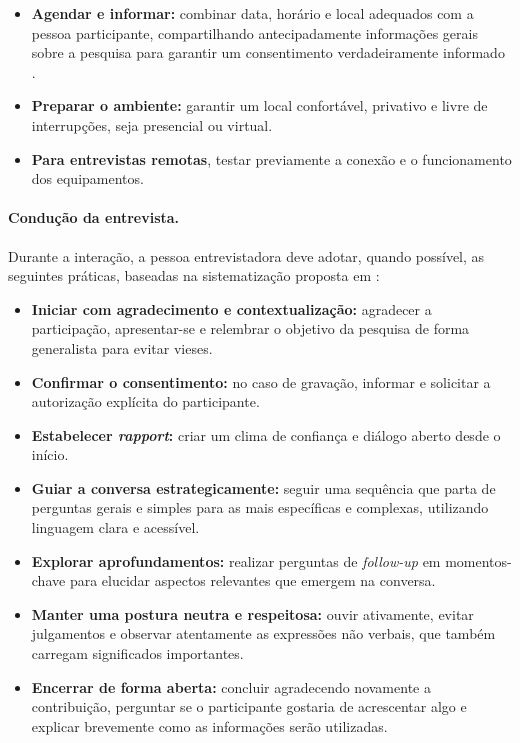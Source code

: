 \documentclass[12pt, a4paper, openany]{book}
\begin{document}
\begin{itemize}
\item \textbf{Agendar e informar:} combinar data, hor\'ario e local adequados com a pessoa participante, compartilhando antecipadamente informa\c{c}\~oes gerais sobre a pesquisa para garantir um consentimento verdadeiramente informado \citep{guazi2021diretrizes}.
\item \textbf{Preparar o ambiente:} garantir um local confort\'avel, privativo e livre de interrup\c{c}\~oes, seja presencial ou virtual.
\item \textbf{Para entrevistas remotas}, testar previamente a conex\~ao e o funcionamento dos equipamentos.
\end{itemize}

\paragraph{Condu\c{c}\~ao da entrevista.} Durante a intera\c{c}\~ao, a pessoa entrevistadora deve adotar, quando poss\'ivel, as seguintes pr\'aticas, baseadas na sistematiza\c{c}\~ao proposta em \citet{rocha2020teoria}:

\begin{itemize}
\item \textbf{Iniciar com agradecimento e contextualiza\c{c}\~ao:} agradecer a participa\c{c}\~ao, apresentar-se e relembrar o objetivo da pesquisa de forma generalista para evitar vieses.
\item \textbf{Confirmar o consentimento:} no caso de grava\c{c}\~ao, informar e solicitar a autoriza\c{c}\~ao expl\'icita do participante.
\item \textbf{Estabelecer \textit{rapport}:} criar um clima de confian\c{c}a e di\'alogo aberto desde o in\'icio.
\item \textbf{Guiar a conversa estrategicamente:} seguir uma sequ\^encia que parta de perguntas gerais e simples para as mais espec\'ificas e complexas, utilizando linguagem clara e acess\'ivel.
\item \textbf{Explorar aprofundamentos:} realizar perguntas de \textit{follow-up} em momentos-chave para elucidar aspectos relevantes que emergem na conversa.
\item \textbf{Manter uma postura neutra e respeitosa:} ouvir ativamente, evitar julgamentos e observar atentamente as express\~oes n\~ao verbais, que tamb\'em carregam significados importantes.
\item \textbf{Encerrar de forma aberta:} concluir agradecendo novamente a contribui\c{c}\~ao, perguntar se o participante gostaria de acrescentar algo e explicar brevemente como as informa\c{c}\~oes ser\~ao utilizadas.
\end{itemize}
\end{document}
